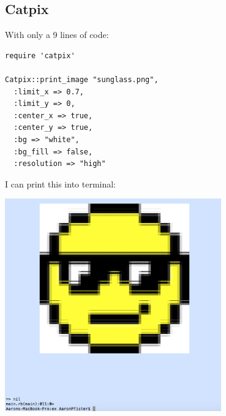 \documentclass{article}
\begin{document}
\subsection*{Catpix \cite{code:github}}
With only a 9 lines of code:
\begin{lstlisting}
require 'catpix'

Catpix::print_image "sunglass.png",
  :limit_x => 0.7,
  :limit_y => 0,
  :center_x => true,
  :center_y => true,
  :bg => "white",
  :bg_fill => false,
  :resolution => "high"
\end{lstlisting}
\newpage
I can print this into terminal:
\begin{center}
    \includegraphics[width=0.7\textwidth]{output}
\end{center}
\newpage


\end{document}
